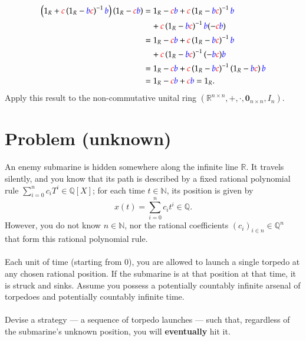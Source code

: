 \documentclass[11pt, a4paper, oneside]{article}
\newcommand{\problem}[1][]{\section{#1} \hfill \par}
\theoremstyle{remark}
\theoremstyle{lemma}
\begin{document}
\[
\begin{aligned}
\left( 1_R + \textcolor{red}{c} \left( 1_R - \textcolor{blue}{b}\textcolor{red}{c} \right)^{-1} \textcolor{blue}{b} \right) \left( 1_R - \textcolor{red}{c}\textcolor{blue}{b} \right)
&= 1_R - \textcolor{red}{c}\textcolor{blue}{b} + \textcolor{red}{c} \left( 1_R - \textcolor{blue}{b}\textcolor{red}{c} \right)^{-1} \textcolor{blue}{b} \\
&\quad + \textcolor{red}{c} \left( 1_R - \textcolor{blue}{b}\textcolor{red}{c} \right)^{-1} \textcolor{blue}{b} (-\textcolor{red}{c}\textcolor{blue}{b}) \\
&= 1_R - \textcolor{red}{c}\textcolor{blue}{b} + \textcolor{red}{c} \left( 1_R - \textcolor{blue}{b}\textcolor{red}{c} \right)^{-1} \textcolor{blue}{b} \\
&\quad + \textcolor{red}{c} \left( 1_R - \textcolor{blue}{b}\textcolor{red}{c} \right)^{-1} (-\textcolor{blue}{b}\textcolor{red}{c}) \textcolor{blue}{b} \\
&= 1_R - \textcolor{red}{c}\textcolor{blue}{b} + \textcolor{red}{c} \left( 1_R - \textcolor{blue}{b}\textcolor{red}{c} \right)^{-1} \left( 1_R - \textcolor{blue}{b}\textcolor{red}{c} \right) \textcolor{blue}{b} \\
&= 1_R - \textcolor{red}{c}\textcolor{blue}{b} + \textcolor{red}{c}\textcolor{blue}{b} = 1_R.
\end{aligned}
\]
Apply this result to the non-commutative unital ring \( \left( \mathbb{R}^{n \times n}, +, \cdot, \mathbf{0}_{n \times n}, I_n \right) \).

\newpage
\problem[Problem (unknown)]
An enemy submarine is hidden somewhere along the infinite line $\mathbb{R}$. It travels silently, and you know that its path is described by a fixed rational polynomial rule \(\sum_{i=0}^{n}c_iT^{i}\in\mathbb{Q}[X]\); for each time \(t \in \mathbb{N}\), its position is given by
\[
x(t) = \sum_{i=0}^{n} c_i t^{i}\in\mathbb{Q}.
\]
However, you do not know \(n \in \mathbb{N}\), nor the rational coefficients \((c_i)_{i \in n} \in \mathbb{Q}^n\) that form this rational polynomial rule.
\\\\
Each unit of time (starting from \(0\)), you are allowed to launch a single torpedo at any chosen rational position. If the submarine is at that position at that time, it is struck and sinks. Assume you possess a potentially countably infinite arsenal of torpedoes and potentially countably infinite time.
\\\\
Devise a strategy — a sequence of torpedo launches — such that, regardless of the submarine's unknown position, you will \textbf{eventually} hit it.
\end{document}
